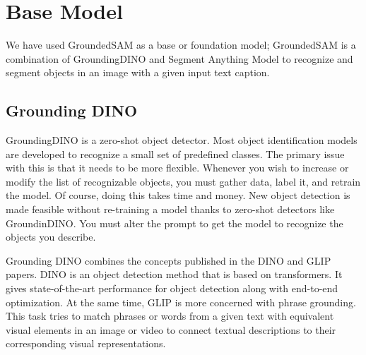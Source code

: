 \section{Base Model} 

\noindent We have used GroundedSAM as a base or foundation model; GroundedSAM is a combination of GroundingDINO\cite{GroundingDINO} and Segment Anything Model\cite{Segment} to recognize and segment objects in an image with a given input text caption. 
\subsection{Grounding DINO}
\noindent GroundingDINO is a zero-shot object detector. Most object identification models are developed to recognize a small set of predefined classes. The primary issue with this is that it needs to be more flexible. Whenever you wish to increase or modify the list of recognizable objects, you must gather data, label it, and retrain the model. Of course, doing this takes time and money. New object detection is made feasible without re-training a model thanks to zero-shot detectors like GroundinDINO. You must alter the prompt to get the model to recognize the objects you describe.

Grounding DINO combines the concepts published in the DINO\cite{dino} and GLIP papers\cite{glip}. DINO is an object detection method that is based on transformers. It gives state-of-the-art performance for object detection along with end-to-end optimization. At the same time, GLIP is more concerned with phrase grounding. This task tries to match phrases or words from a given text with equivalent visual elements in an image or video to connect textual descriptions to their corresponding visual representations.

